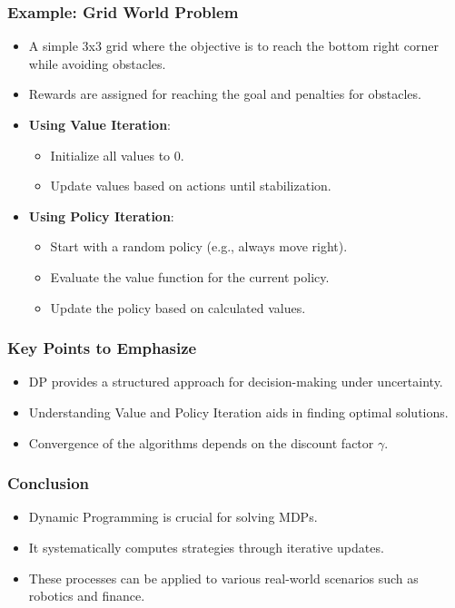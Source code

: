 \documentclass[aspectratio=169]{beamer}
\begin{document}
\begin{frame}[fragile]
    \frametitle{Example: Grid World Problem}
    \begin{itemize}
        \item A simple 3x3 grid where the objective is to reach the bottom right corner while avoiding obstacles.
        \item Rewards are assigned for reaching the goal and penalties for obstacles.
          
        \item \textbf{Using Value Iteration}:
        \begin{itemize}
            \item Initialize all values to 0.
            \item Update values based on actions until stabilization.
        \end{itemize}

        \item \textbf{Using Policy Iteration}:
        \begin{itemize}
            \item Start with a random policy (e.g., always move right).
            \item Evaluate the value function for the current policy.
            \item Update the policy based on calculated values.
        \end{itemize}
    \end{itemize}
\end{frame}

\begin{frame}[fragile]
    \frametitle{Key Points to Emphasize}
    \begin{itemize}
        \item DP provides a structured approach for decision-making under uncertainty.
        \item Understanding Value and Policy Iteration aids in finding optimal solutions.
        \item Convergence of the algorithms depends on the discount factor $\gamma$.
    \end{itemize}
\end{frame}

\begin{frame}[fragile]
    \frametitle{Conclusion}
    \begin{itemize}
        \item Dynamic Programming is crucial for solving MDPs.
        \item It systematically computes strategies through iterative updates.
        \item These processes can be applied to various real-world scenarios such as robotics and finance.
    \end{itemize}
\end{frame}
\end{document}

